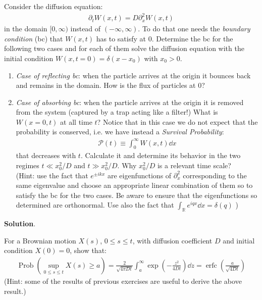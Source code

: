 \documentclass[../template.tex]{subfiles}
\begin{document}
\begin{exo}
    Consider the diffusion equation:
    \begin{align*}
        \partial_t W(x,t) = D \partial_x^2 W(x,t)
    \end{align*}
    in the domain $[0,\infty)$ instead of $(-\infty,\infty)$. To do that one needs the \textit{boundary condition} (bc) that $W(x,t)$ has to satisfy at $0$. Determine the bc for the following two cases and for each of them solve the diffusion equation with the initial condition $W(x,t=0) = \delta(x-x_0 )$ with $x_0 > 0$.
    \begin{enumerate}
        \item \textit{Case of reflecting bc}: when the particle arrives at the origin it bounces back and remains in the domain. How is the flux of particles at $0$?
        \item \textit{Case of absorbing bc}: when the particle arrives at the origin it is removed from the system (captured by a trap acting like a filter!) What is $W(x=0, t)$ at all time $t$? Notice that in this case we do not expect that the probability is conserved, i.e. we have instead a \textit{Survival Probability}:
        \begin{align*}
            \mathcal{P}(t) \equiv \int_0^\infty W(x,t) \dd{x}    
        \end{align*}      
        that decreases with $t$. Calculate it and determine its behavior in the two regimes $t \ll x_0^2/D$ and $t \gg x_0^2/D$. Why $x_0^2/D$ is a relevant time scale?\\
        (Hint: use the fact that $e^{\pm ikx}$ are eigenfunctions of $\partial_x^2$ corresponding to the same eigenvalue and choose an appropriate linear combination of them so to satisfy the bc for the two cases. Be aware to ensure that the eigenfunctions so determined are orthonormal. Use also the fact that $\int_{\mathbb{R}} e^{iqx} \dd{x} = \delta(q)$  )
    \end{enumerate}
    
    \medskip

    \textbf{Solution}.  
\end{exo}

\begin{exo}
    For a Brownian motion $X(s)$, $0\leq s \leq t$, with diffusion coefficient $D$ and initial condition $X(0) = 0$, show that:
    \begin{align*}
        \operatorname{Prob}\left(\sup_{0 \leq s \leq t} X(s) \geq a \right) = \frac{2}{\sqrt{4 \pi D t }} \int_a^{\infty} \exp\left(-\frac{z^2}{4 Dt } \right) \dd{z} = \operatorname{erfc}\left(\frac{a}{\sqrt{4 D t}} \right) 
    \end{align*}  
    (Hint: some of the results of previous exercises are useful to derive the above result.)
\end{exo}
\end{document}
